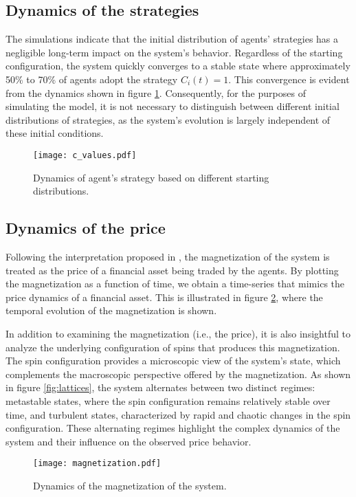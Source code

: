 \subsection{Dynamics of the strategies}
The simulations indicate that the initial distribution of agents' strategies has a negligible long-term impact on the system's behavior. Regardless of the starting configuration, the system quickly converges to a stable state where approximately 50\% to 70\% of agents adopt the strategy $C_i(t) = 1$. This convergence is evident from the dynamics shown in figure \ref{fig:strategies}. Consequently, for the purposes of simulating the model, it is not necessary to distinguish between different initial distributions of strategies, as the system's evolution is largely independent of these initial conditions.

\begin{figure}[H]
    \centering
    \texttt{[image: c\_values.pdf]}
    \caption{Dynamics of agent's strategy based on different starting distributions.}
    \label{fig:strategies}
\end{figure}

\subsection{Dynamics of the price}
Following the interpretation proposed in \cite{bornholdt}, the magnetization of the system is treated as the price of a financial asset being traded by the agents. By plotting the magnetization as a function of time, we obtain a time-series that mimics the price dynamics of a financial asset. This is illustrated in figure \ref{fig:magnetization}, where the temporal evolution of the magnetization is shown.

In addition to examining the magnetization (i.e., the price), it is also insightful to analyze the underlying configuration of spins that produces this magnetization. The spin configuration provides a microscopic view of the system's state, which complements the macroscopic perspective offered by the magnetization. As shown in figure \ref{fig:lattices}, the system alternates between two distinct regimes: metastable states, where the spin configuration remains relatively stable over time, and turbulent states, characterized by rapid and chaotic changes in the spin configuration. These alternating regimes highlight the complex dynamics of the system and their influence on the observed price behavior.

\begin{figure}[H]
    \centering
    \texttt{[image: magnetization.pdf]}
    \caption{Dynamics of the magnetization of the system.}
    \label{fig:magnetization}
\end{figure}

